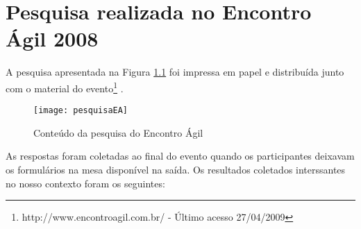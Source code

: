 \chapter{Pesquisa realizada no Encontro Ágil 2008}
\label{ape:EA}

A pesquisa apresentada na Figura \ref{fig:pesquisaEA} foi impressa em
papel e distribuída junto com o material do
evento\footnote{http://www.encontroagil.com.br/ - Último acesso
  27/04/2009} .

\begin{figure}[th]
  \centering
  \texttt{[image: pesquisaEA]}
  \caption{Conteúdo da pesquisa do Encontro Ágil}
  \label{fig:pesquisaEA}
\end{figure}

As respostas foram coletadas ao final do evento quando os
participantes deixavam os formulários na mesa disponível na saída. Os
resultados coletados interssantes no nosso contexto foram os
seguintes:

